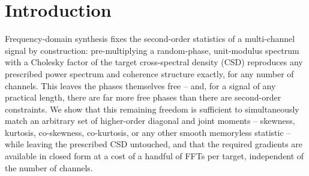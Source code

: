 \documentclass[10pt,a4paper]{article}
\numberwithin{equation}{section}
\begin{document}
\pagestyle{fancy}
\lhead{}%
\chead{}
\cfoot{}
\renewcommand{\headrulewidth}{0.5pt}
\renewcommand{\footrulewidth}{0.5pt}


\section*{Introduction}
Frequency-domain synthesis fixes the second-order statistics of a multi-channel signal by construction: pre-multiplying a random-phase, unit-modulus spectrum with a Cholesky factor of the target cross-spectral density (CSD) reproduces any prescribed power spectrum and coherence structure exactly, for any number of channels. This leaves the phases themselves free -- and, for a signal of any practical length, there are far more free phases than there are second-order constraints. We show that this remaining freedom is sufficient to simultaneously match an arbitrary set of higher-order diagonal and joint moments -- skewness, kurtosis, co-skewness, co-kurtosis, or any other smooth memoryless statistic -- while leaving the prescribed CSD untouched, and that the required gradients are available in closed form at a cost of a handful of FFTs per target, independent of the number of channels.
\end{document}
